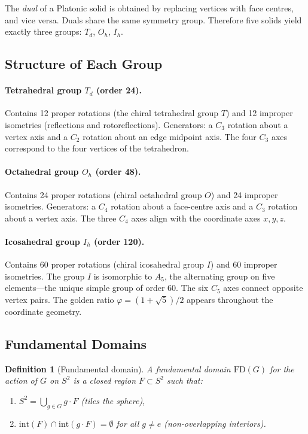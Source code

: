 \documentclass[11pt, a4paper]{article}
\newtheorem{definition}{Definition}[section]
\newcommand{\FD}{\mathrm{FD}}
\newcommand{\Td}{T_d}
\newcommand{\Oh}{O_h}
\newcommand{\Ih}{I_h}
\begin{document}
The \emph{dual} of a Platonic solid is obtained by replacing vertices with
face centres, and vice versa. Duals share the same symmetry group. Therefore
five solids yield exactly three groups: $\Td$, $\Oh$, $\Ih$.

\subsection{Structure of Each Group}

\paragraph{Tetrahedral group $\Td$ (order 24).}
Contains 12 proper rotations (the chiral tetrahedral group $T$) and 12
improper isometries (reflections and rotoreflections). Generators: a $C_3$
rotation about a vertex axis and a $C_2$ rotation about an edge midpoint axis.
The four $C_3$ axes correspond to the four vertices of the tetrahedron.

\paragraph{Octahedral group $\Oh$ (order 48).}
Contains 24 proper rotations (chiral octahedral group $O$) and 24 improper
isometries. Generators: a $C_4$ rotation about a face-centre axis and a $C_3$
rotation about a vertex axis. The three $C_4$ axes align with the coordinate
axes $x, y, z$.

\paragraph{Icosahedral group $\Ih$ (order 120).}
Contains 60 proper rotations (chiral icosahedral group $I$) and 60 improper
isometries. The group $I$ is isomorphic to $A_5$, the alternating group on
five elements—the unique simple group of order 60. The six $C_5$ axes connect
opposite vertex pairs. The golden ratio $\varphi = (1+\sqrt{5})/2$ appears
throughout the coordinate geometry.

\subsection{Fundamental Domains}
\label{sec:fd}

\begin{definition}[Fundamental domain]
A \emph{fundamental domain} $\FD(G)$ for the action of $G$ on $S^2$ is a
closed region $F \subset S^2$ such that:
\begin{enumerate}
  \item $S^2 = \bigcup_{g \in G} g \cdot F$ \quad (tiles the sphere),
  \item $\mathrm{int}(F) \cap \mathrm{int}(g \cdot F) = \emptyset$ for all $g \neq e$ \quad (non-overlapping interiors).
\end{enumerate}
\end{definition}
\end{document}
